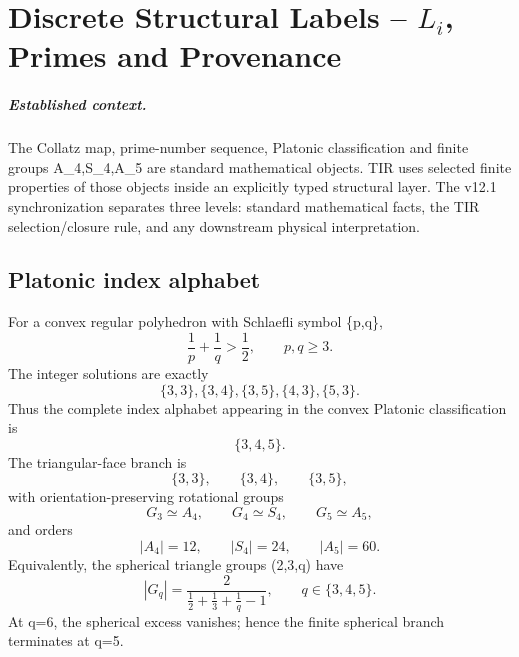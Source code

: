 \documentclass[11pt,a4paper,twoside]{book}
\def\({}%
\def\){}%
\theoremstyle{definition}
\begin{document}
\clearpage

\chapter[Discrete Structural Labels]{Discrete Structural Labels -- $L_i$, Primes and Provenance}
\label{ch:v12_discrete_labels}

\paragraph{Established context.}
The Collatz map, prime-number sequence, Platonic classification and finite groups
\(A_4,S_4,A_5\) are standard mathematical objects.  TIR uses selected finite
properties of those objects inside an explicitly typed structural layer.  The
v12.1 synchronization separates three levels: standard mathematical facts, the
TIR selection/closure rule, and any downstream physical interpretation.

\section{Platonic index alphabet}

For a convex regular polyhedron with Schlaefli symbol \(\{p,q\}\),
\[
\frac1p+\frac1q>\frac12,
\qquad p,q\ge3.
\]
The integer solutions are exactly
\[
\boxed{
\{3,3\},\{3,4\},\{3,5\},\{4,3\},\{5,3\}.
}
\]
Thus the complete index alphabet appearing in the convex Platonic
classification is
\[
\boxed{\{3,4,5\}}.
\]
The triangular-face branch is
\[
\{3,3\},\qquad\{3,4\},\qquad\{3,5\},
\]
with orientation-preserving rotational groups
\[
G_3\simeq A_4,
\qquad
G_4\simeq S_4,
\qquad
G_5\simeq A_5,
\]
and orders
\[
|A_4|=12,
\qquad |S_4|=24,
\qquad |A_5|=60.
\]
Equivalently, the spherical triangle groups \((2,3,q)\) have
\[
|G_q|
=\frac{2}{\frac12+\frac13+\frac1q-1},
\qquad q\in\{3,4,5\}.
\]
At \(q=6\), the spherical excess vanishes; hence the finite spherical branch
terminates at \(q=5\).
\end{document}
